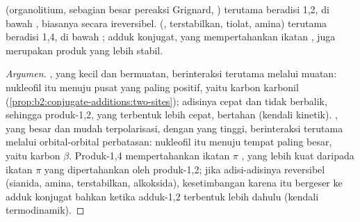 \begin{proposition}\label{prop:b2:conjugate-additions:regio}
 (organolitium, sebagian besar pereaksi Grignard, )
terutama beradisi 1,2, di bawah , biasanya secara
ireversibel.  (,  terstabilkan, tiolat,
amina) terutama beradisi 1,4, di bawah ; adduk konjugat, yang
mempertahankan ikatan , juga merupakan produk yang lebih stabil.
\end{proposition}

\begin{proof}[Argumen]
, yang kecil dan bermuatan, berinteraksi terutama melalui
muatan: nukleofil itu menuju pusat yang paling positif, yaitu karbon
karbonil (\cref{prop:b2:conjugate-additions:two-sites}); adisinya cepat dan
tidak berbalik, sehingga produk-1,2, yang terbentuk lebih cepat, bertahan
(kendali kinetik). , yang besar dan mudah terpolarisasi,
dengan  yang tinggi, berinteraksi terutama melalui orbital-orbital
perbatasan: nukleofil itu menuju tempat  paling besar, yaitu karbon
$\beta$. Produk-1,4 mempertahankan ikatan $\pi$ , yang lebih kuat
daripada ikatan $\pi$  yang dipertahankan oleh produk-1,2; jika
adisi-adisinya reversibel (sianida, amina,  terstabilkan, alkoksida),
kesetimbangan karena itu bergeser ke adduk konjugat bahkan ketika
adduk-1,2 terbentuk lebih dahulu (kendali termodinamik).
\end{proof}

